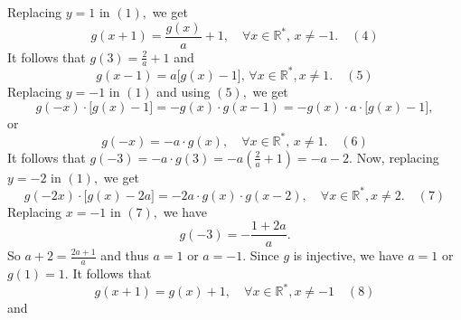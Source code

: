 \begin{solution}
Replacing $y=1$ in $(1),$ we get \[g(x+1)=\frac{g(x)}{a}+1,\quad \forall x \in \mathbb R^*,\, x \ne -1.\quad (4)\] It follows that $g(3)=\frac{2}{a}+1$ and \[g(x-1)=a\big[g(x)-1\big],\, \forall x \in \mathbb R^*, x\ne 1.\quad (5)\] Replacing $y=-1$ in $(1)$ and using $(5),$ we get \[g({-x})\cdot \big[ g(x)-1\big] =-g(x)\cdot g(x-1)=-g(x)\cdot a \cdot \big[ g(x)-1\big],\] or \[g({-x})=-a\cdot g(x),\quad \forall x \in \mathbb R^*,\, x \ne 1.\quad (6)\] It follows that $g({-3})=-a\cdot g(3)=-a\left(\frac{2}{a}+1\right)=-a-2.$ Now, replacing $y=-2$ in $(1),$ we get \[g({-2x})\cdot \big[g(x)-2a\big]=-2a\cdot g(x)\cdot g(x-2),\quad \forall x \in \mathbb R^*, x\ne 2.\quad (7)\] Replacing $x=-1$ in $(7),$ we have \[g({-3})=-\frac{1+2a}{a}.\] So $a+2=\frac{2a+1}{a}$ and thus $a=1$ or $a=-1.$ Since $g$ is injective, we have $a=1$ or $g(1)=1.$ It follows that \[g(x+1)=g(x)+1,\quad \forall x \in \mathbb R^*, x \ne -1\quad (8)\]
and

\end{solution}
